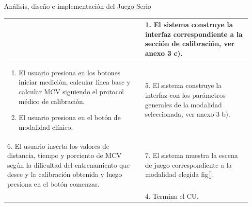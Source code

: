 \begin{thesischapter}{2} {Análisis, diseño e implementación del Juego Serio}
\begin{center}
\begin{table}
\begin{tabularx}{\textwidth}{|X|X|}
                & 
                1. El sistema construye la interfaz correspondiente a la sección de calibración, ver anexo 3 c). \\\hline
                \begin{enumerate}
                    \item[2.] El usuario presiona en los botones iniciar medición, calcular línea base y calcular MCV siguiendo el protocol médico de calibración.
                    \item[3.] El usuario presiona en el botón de modalidad clínico.
                \end{enumerate}
                &
                5. El sistema construye la interfaz con los parámetros generales de la modalidad seleccionada, ver anexo 3 b). \\\hline
                6. El usuario inserta los valores de distancia, tiempo y porciento de MCV según la dificultad del entrenamiento que desee y la calibración obtenida y luego presiona en el botón comenzar. 
                & 
                7. El sistema muestra la escena de juego correspondiente a la modalidad elegida fig\ref{}. \\ &4. Termina el CU. \\\hline
                

                
                



\end{tabularx}
\end{table}
\end{center}
\end{thesischapter}
